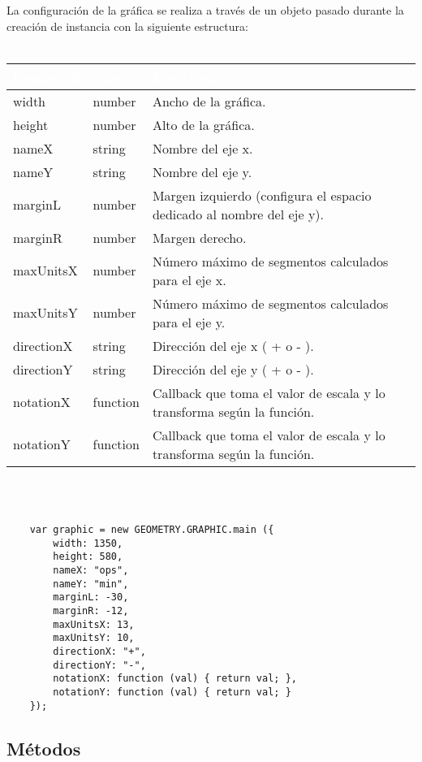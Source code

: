 \documentclass[10pt]{article}
\begin{document}
La configuración de la gráfica se realiza a través de un objeto pasado durante la creación de instancia con la siguiente estructura:
\\\\
\begin{tabular}{|m{2.2cm}|m{1.5cm}|m{11.5cm}|}
	\hline
	\rowcolor{black}\textcolor{white}{Propiedad} & \textcolor{white}{Tipo} & \textcolor{white}{Descripción} \\
	\hline
	width & number & Ancho de la gráfica. \\
	\hline
	height & number & Alto de la gráfica. \\
	\hline
	nameX & string & Nombre del eje x. \\
	\hline
	nameY & string & Nombre del eje y. \\
	\hline
	marginL & number & Margen izquierdo (configura el espacio dedicado al nombre del eje y). \\
	\hline
	marginR & number & Margen derecho. \\
	\hline
	maxUnitsX & number & Número máximo de segmentos calculados para el eje x. \\
	\hline
	maxUnitsY & number & Número máximo de segmentos calculados para el eje y. \\
	\hline
	directionX & string & Dirección del eje x ( + o - ). \\
	\hline
	directionY & string & Dirección del eje y ( + o - ). \\
	\hline
	notationX & function & Callback que toma el valor de escala y lo transforma según la función. \\
	\hline
	notationY & function & Callback que toma el valor de escala y lo transforma según la función. \\
	\hline
\end{tabular}
\\\\
\begin{lstlisting}
	var graphic = new GEOMETRY.GRAPHIC.main ({
		width: 1350,
        height: 580,
        nameX: "ops",
        nameY: "min",
        marginL: -30,
        marginR: -12,
        maxUnitsX: 13,
        maxUnitsY: 10,
        directionX: "+",
        directionY: "-",
        notationX: function (val) { return val; },
        notationY: function (val) { return val; }
	});
\end{lstlisting}
\newpage
\subsection{Métodos}
\end{document}

